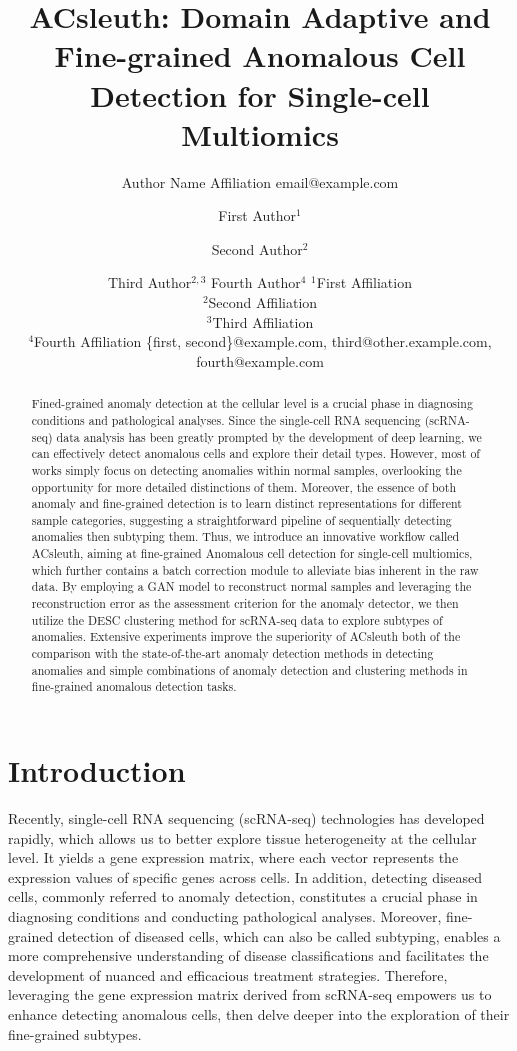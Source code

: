 \documentclass{article}
\title{ACsleuth: Domain Adaptive and Fine-grained Anomalous Cell Detection for Single-cell Multiomics}
\author{
    Author Name
    \affiliations
    Affiliation
    \emails
    email@example.com
}
\author{
First Author$^1$
\and
Second Author$^2$\and
Third Author$^{2,3}$\And
Fourth Author$^4$
\affiliations
$^1$First Affiliation\\
$^2$Second Affiliation\\
$^3$Third Affiliation\\
$^4$Fourth Affiliation
\emails
\{first, second\}@example.com,
third@other.example.com,
fourth@example.com
}
\begin{document}
\maketitle

\begin{abstract}
    Fined-grained anomaly detection at the cellular level is a crucial phase in diagnosing 
    conditions and pathological analyses. Since the single-cell RNA sequencing (scRNA-seq) 
    data analysis has been greatly prompted by the development of deep learning, we can 
    effectively detect anomalous cells and explore their detail types. However, most of 
    works simply focus on detecting anomalies within normal samples, overlooking the 
    opportunity for more detailed distinctions of them. Moreover, the essence of both 
    anomaly and fine-grained detection is to learn distinct representations for different 
    sample categories, suggesting a straightforward pipeline of sequentially detecting 
    anomalies then subtyping them. Thus, we introduce an innovative workflow called ACsleuth, 
    aiming at fine-grained Anomalous cell detection for single-cell multiomics, which 
    further contains a batch correction module to alleviate bias inherent in the raw 
    data. By employing a GAN model to reconstruct normal samples and leveraging the 
    reconstruction error as the assessment criterion for the anomaly detector, we then 
    utilize the DESC clustering method for scRNA-seq data to explore subtypes of anomalies. 
    Extensive experiments improve the superiority of ACsleuth both of the comparison with the 
    state-of-the-art anomaly detection methods in detecting anomalies and simple 
    combinations of anomaly detection and clustering methods in fine-grained anomalous detection tasks.
\end{abstract}

\section{Introduction}

Recently, single-cell RNA sequencing (scRNA-seq) technologies has developed rapidly, 
which allows us to better explore tissue heterogeneity at the cellular level. It yields 
a gene expression matrix, where each vector represents the expression values of specific 
genes across cells. In addition, detecting diseased cells, commonly referred to anomaly 
detection, constitutes a crucial phase in diagnosing conditions and conducting pathological 
analyses. Moreover, fine-grained detection of diseased cells, which can also be called subtyping, enables a more comprehensive 
understanding of disease classifications and facilitates the development of nuanced and 
efficacious treatment strategies. Therefore, leveraging the gene expression matrix derived 
from scRNA-seq empowers us to enhance detecting anomalous cells, then delve deeper into 
the exploration of their fine-grained subtypes.
\end{document}
